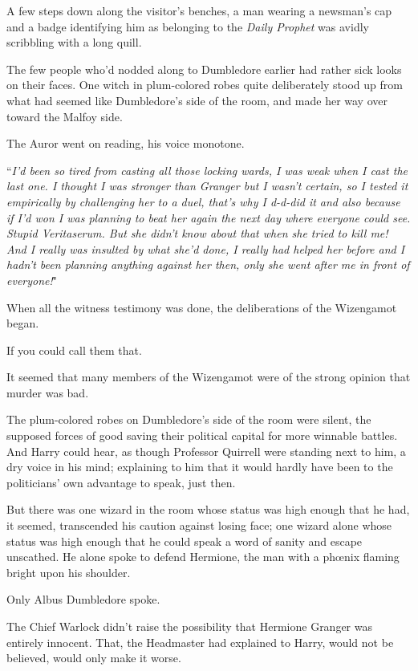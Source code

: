 A few steps down along the visitor's benches, a man wearing a newsman's cap and a badge identifying him as belonging to the \emph{Daily Prophet} was avidly scribbling with a long quill.

The few people who'd nodded along to Dumbledore earlier had rather sick looks on their faces. One witch in plum-colored robes quite deliberately stood up from what had seemed like Dumbledore's side of the room, and made her way over toward the Malfoy side.

The Auror went on reading, his voice monotone.

``\emph{I'd been so tired from casting all those locking wards, I was weak when I cast the last one. I thought I was stronger than Granger but I wasn't certain, so I tested it empirically by challenging her to a duel, that's why I d-d-did it and also because if I'd won I was planning to beat her again the next day where everyone could see. Stupid Veritaserum. But \emph{she} didn't know about that when she tried to \emph{kill} me! And I really was insulted by what she'd done, I really had helped her before and I hadn't been planning anything against her then, only \emph{she} went after \emph{me} in front of everyone!}"

When all the witness testimony was done, the deliberations of the Wizengamot began.

If you could call them that.

It seemed that many members of the Wizengamot were of the strong opinion that murder was bad.

The plum-colored robes on Dumbledore's side of the room were silent, the supposed forces of good saving their political capital for more winnable battles. And Harry could hear, as though Professor Quirrell were standing next to him, a dry voice in his mind; explaining to him that it would hardly have been to the politicians' own advantage to speak, just then.

But there was one wizard in the room whose status was high enough that he had, it seemed, transcended his caution against losing face; one wizard alone whose status was high enough that he could speak a word of sanity and escape unscathed. He alone spoke to defend Hermione, the man with a phœnix flaming bright upon his shoulder.

Only Albus Dumbledore spoke.

The Chief Warlock didn't raise the possibility that Hermione Granger was entirely innocent. That, the Headmaster had explained to Harry, would not be believed, would only make it worse.

